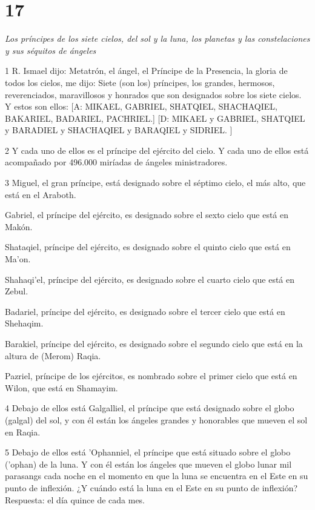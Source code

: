 \chapter{17}

\par \textit{Los príncipes de los siete cielos, del sol y la luna, los planetas y las constelaciones y sus séquitos de ángeles}

\par 1 R. Ismael dijo: Metatrón, el ángel, el Príncipe de la Presencia, la gloria de todos los cielos, me dijo: Siete (son los) príncipes, los grandes, hermosos, reverenciados, maravillosos y honrados que son designados sobre los siete cielos. Y estos son ellos: [A: MIKAEL, GABRIEL, SHATQIEL, SHACHAQIEL, BAKARIEL, BADARIEL, PACHRIEL.] [D: MIKAEL y GABRIEL, SHATQIEL y BARADIEL y SHACHAQIEL y BARAQIEL y SIDRIEL. ]

\par 2 Y cada uno de ellos es el príncipe del ejército del cielo. Y cada uno de ellos está acompañado por 496.000 miríadas de ángeles ministradores.

\par 3 Miguel, el gran príncipe, está designado sobre el séptimo cielo, el más alto, que está en el Araboth.

Gabriel, el príncipe del ejército, es designado sobre el sexto cielo que está en Makón.

Shataqiel, príncipe del ejército, es designado sobre el quinto cielo que está en Ma'on.

Shahaqi'el, príncipe del ejército, es designado sobre el cuarto cielo que está en Zebul.

Badariel, príncipe del ejército, es designado sobre el tercer cielo que está en Shehaqim.

Barakiel, príncipe del ejército, es designado sobre el segundo cielo que está en la altura de (Merom) Raqia.

Pazriel, príncipe de los ejércitos, es nombrado sobre el primer cielo que está en Wilon, que está en Shamayim.

\par 4 Debajo de ellos está Galgalliel, el príncipe que está designado sobre el globo (galgal) del sol, y con él están los ángeles grandes y honorables que mueven el sol en Raqia.

\par 5 Debajo de ellos está 'Ophanniel, el príncipe que está situado sobre el globo ('ophan) de la luna. Y con él están los ángeles que mueven el globo lunar mil parasangs cada noche en el momento en que la luna se encuentra en el Este en su punto de inflexión. ¿Y cuándo está la luna en el Este en su punto de inflexión? Respuesta: el día quince de cada mes.


